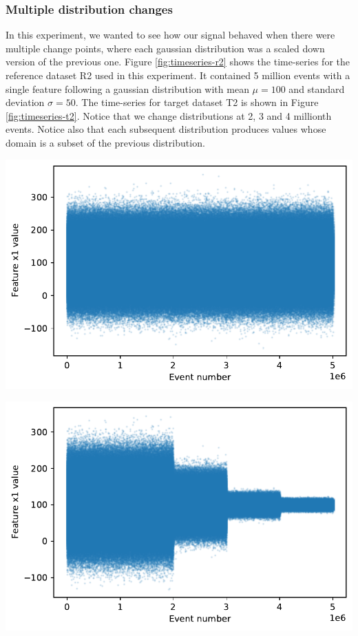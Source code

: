 \subsubsection{Multiple distribution changes}
In this experiment, we wanted to see how our signal behaved when there were multiple change points, where each gaussian distribution was a scaled down version of the previous one. Figure \ref{fig:timeseries-r2} shows the time-series for the reference dataset R2 used in this experiment. It contained 5 million events with a single feature following a gaussian distribution with mean $\mu=100$ and standard deviation $\sigma=50$. The time-series for target dataset T2 is shown in Figure \ref{fig:timeseries-t2}. Notice that we change distributions at 2, 3 and 4 millionth events. Notice also that each subsequent distribution produces values whose domain is a subset of the previous distribution.
\begin{center}
\begin{minipage}{.5\textwidth}
  \centering
  \includegraphics[width=1\linewidth]{figures/timeseries-r2.pdf}
  \label{fig:timeseries-r2}
\end{minipage}%
\begin{minipage}{.5\textwidth}
  \centering
  \includegraphics[width=1\linewidth]{figures/timeseries-t2.pdf}
  \label{fig:timeseries-t2}
\end{minipage}
\end{center}

